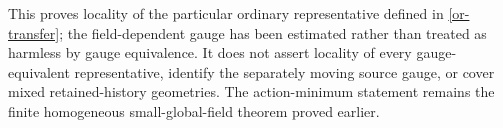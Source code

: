 \documentclass[11pt]{article}
\theoremstyle{remark}
\begin{document}
This proves locality of the particular ordinary representative
defined in \eqref{or-transfer}; the field-dependent gauge has been
estimated rather than treated as harmless by gauge equivalence.
It does not assert locality of every gauge-equivalent representative,
identify the separately moving source gauge, or cover mixed
retained-history geometries. The action-minimum statement remains
the finite homogeneous small-global-field theorem proved earlier.
\end{document}
